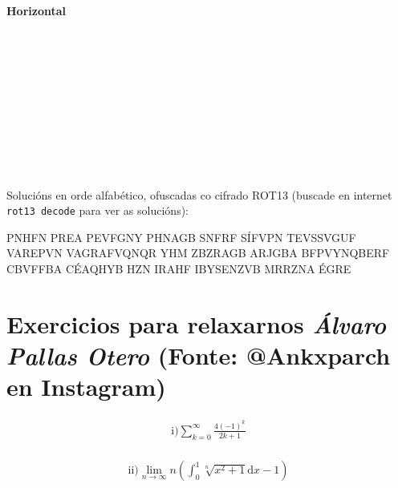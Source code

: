 \begin{refsection}
\begin{multicols}{2}
\begin{PuzzleClues}{\textbf{Horizontal}}\\
\\
\\
\\
\\
\\
\\
\\
\\
\\
\\
\end{PuzzleClues}
\end{multicols}


\begin{center}
Solucións en orde alfabético, ofuscadas co cifrado ROT13 (buscade en internet \texttt{rot13 decode} para ver as solucións):

\vspace*{1em}

PNHFN PREA PEVFGNY PHNAGB SNFRF SÍFVPN TEVSSVGUF VAREPVN VAGRAFVQNQR YHM
ZBZRAGB ARJGBA BFPVYNQBERF CBVFFBA CÉAQHYB HZN IRAHF IBYSENZVB MRRZNA ÉGRE
\end{center}

\section*{\textcolor{Resalte}{Exercicios para relaxarnos}  {\normalfont \itshape Álvaro Pallas Otero}   \hfill     {\small (Fonte: @Ankxparch en Instagram)}}%

\begin{multicols}{2}
\begin{gather*}
    \text{i)} \sum_{k=0}^\infty \frac{4(-1)^k}{2k+1}
\end{gather*}\\
\begin{gather*}
    \text{ii)} \lim_{n\rightarrow \infty} n\left(\int_0^1 \sqrt[n]{x^2+1}\text{d}x -1\right)
\end{gather*}
\end{multicols}


\end{refsection}

